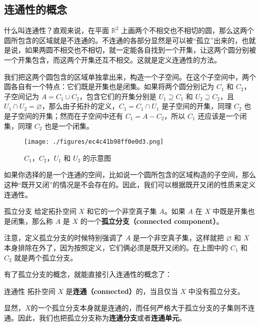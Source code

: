 

\subsection{连通性的概念}
什么叫连通性？直观来说，在平面 $\mathbb{R}^2$ 上画两个不相交也不相切的圆，那么这两个圆所包含的区域就是不连通的。不连通的各部分显然是可以被“孤立”出来的，也就是说，如果两圆不相交也不相切，就一定能各自找到一个开集，让这两个圆分别被一个开集包含，而这两个开集还互不相交。这就是定义连通性的方法。

我们把这两个圆包含的区域单独拿出来，构造一个子空间。在这个子空间中，两个圆各自有一个特点：它们既是开集也是闭集。如果将两个圆分别记为 $C_1$ 和 $C_2$，子空间记为 $A=C_1\cup C_2$，包含它们的开集分别是 $U_1\supseteq C_1$ 和 $U_2\supseteq C_2$，且 $U_1\cap U_2=\varnothing$，那么由子拓扑的定义，$C_1=C_1\cap U_1$ 是子空间的开集，同理 $C_2$ 也是子空间的开集；然而在子空间中还有 $C_1=A-C_2$，所以 $C_1$ 还应该是一个闭集，同理 $C_2$ 也是一个闭集。

\begin{figure}[ht]
\centering
\texttt{[image: ./figures/ec4c41b98ff0e0d3.png]}
\caption{$C_1$，$C_2$，$U_1$ 和 $U_2$ 的示意图} \label{fig_Topo3_1}
\end{figure}

如果你选择的是一个连通的空间，比如说一个圆所包含的区域构造的子空间，那么这种“既开又闭”的情况是不会存在的。因此，我们可以根据既开又闭的性质来定义连通性。

\begin{definition}{孤立分支}
给定拓扑空间 $X$ 和它的一个非空真子集 $A$。如果 $A$ 在 $X$ 中既是开集也是闭集，那么称 $A$ 是 $X$ 的一个\textbf{孤立分支（connected component）}。
\end{definition}

注意，定义孤立分支的时候特别强调了 $A$ 是一个非空真子集，这样就把 $\varnothing$ 和 $X$ 本身排除在外了，因为按照定义，它们俩必须是既开又闭的。在上图中的 $C_1$ 和 $C_2$ 就是两个孤立分支。

有了孤立分支的概念，就能直接引入连通性的概念了：

\begin{definition}{连通性}
拓扑空间 $X$ 是\textbf{连通（connected）}的，当且仅当 $X$ 中没有孤立分支。
\end{definition}

显然，$X$的一个孤立分支本身就是连通的，而任何严格大于孤立分支的子集则不连通。因此，我们也把孤立分支称为\textbf{连通分支}或者\textbf{连通单元}。

